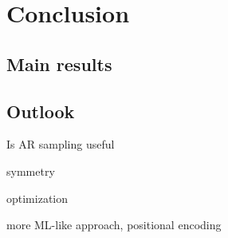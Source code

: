 \chapter{Conclusion}
\label{ch:conclusion}


\section{Main results}

\section{Outlook}

Is AR sampling useful

symmetry

optimization

more ML-like approach, positional encoding
